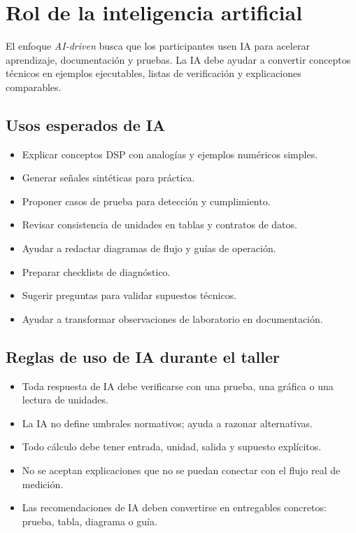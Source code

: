 \documentclass[11pt,a4paper]{article}
\newcommand{\aidriven}{\textit{AI-driven}}
\begin{document}
\section*{Rol de la inteligencia artificial}

El enfoque \aidriven{} busca que los participantes usen IA para acelerar aprendizaje, documentación y pruebas. La IA debe ayudar a convertir conceptos técnicos en ejemplos ejecutables, listas de verificación y explicaciones comparables.

\subsection*{Usos esperados de IA}

\begin{itemize}
  \item Explicar conceptos DSP con analogías y ejemplos numéricos simples.
  \item Generar señales sintéticas para práctica.
  \item Proponer casos de prueba para detección y cumplimiento.
  \item Revisar consistencia de unidades en tablas y contratos de datos.
  \item Ayudar a redactar diagramas de flujo y guías de operación.
  \item Preparar checklists de diagnóstico.
  \item Sugerir preguntas para validar supuestos técnicos.
  \item Ayudar a transformar observaciones de laboratorio en documentación.
\end{itemize}

\subsection*{Reglas de uso de IA durante el taller}

\begin{itemize}
  \item Toda respuesta de IA debe verificarse con una prueba, una gráfica o una lectura de unidades.
  \item La IA no define umbrales normativos; ayuda a razonar alternativas.
  \item Todo cálculo debe tener entrada, unidad, salida y supuesto explícitos.
  \item No se aceptan explicaciones que no se puedan conectar con el flujo real de medición.
  \item Las recomendaciones de IA deben convertirse en entregables concretos: prueba, tabla, diagrama o guía.
\end{itemize}
\end{document}
